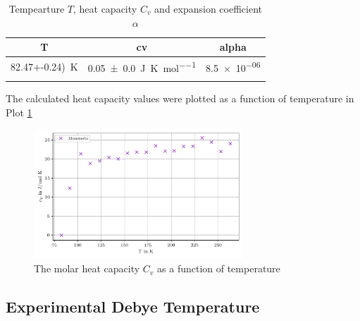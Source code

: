 \begin{table}[H]
	\centering
	\caption{Tempearture $T$, heat capacity $C_v$ and expansion coefficient $\alpha$}
	\begin{tabular}{c c c}
	\toprule
	T & cv & alpha\\
	\midrule
	\qty{82.47+-0.24)}{\kelvin}& \qty{0.05+-0.0}{\joule \per \kelvin\per\mol}& \num{8.5e-06} \\
	\qty{}
	\bottomrule
	\end{tabular}
	\end{table}

The calculated heat capacity values were plotted as a function of temperature in Plot \ref{fig:heat_capacity_plot}
\begin{figure}[H]
	\centering
	\includegraphics[width=0.7\textwidth]{build/Cv.pdf}
	\caption{The molar heat capacity $C_v$ as a function of temperature}
	\label{fig:heat_capacity_plot}
\end{figure}

\subsection{Experimental Debye Temperature}
\label{sec:experimental_debye_temperature}
